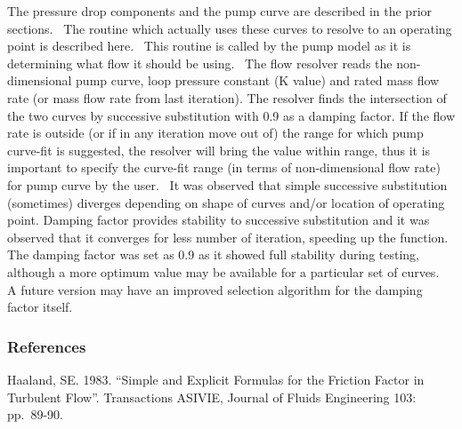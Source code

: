 The pressure drop components and the pump curve are described in the prior sections.~ The routine which actually uses these curves to resolve to an operating point is described here.~ This routine is called by the pump model as it is determining what flow it should be using.~ The flow resolver reads the non-dimensional pump curve, loop pressure constant (K value) and rated mass flow rate (or mass flow rate from last iteration). The resolver finds the intersection of the two curves by successive substitution with 0.9 as a damping factor. If the flow rate is outside (or if in any iteration move out of) the range for which pump curve-fit is suggested, the resolver will bring the value within range, thus it is important to specify the curve-fit range (in terms of non-dimensional flow rate) for pump curve by the user.~ It was observed that simple successive substitution (sometimes) diverges depending on shape of curves and/or location of operating point. Damping factor provides stability to successive substitution and it was observed that it converges for less number of iteration, speeding up the function. The damping factor was set as 0.9 as it showed full stability during testing, although a more optimum value may be available for a particular set of curves.~ A future version may have an improved selection algorithm for the damping factor itself.

\subsubsection{References}\label{references-037}

Haaland, SE. 1983. ``Simple and Explicit Formulas for the Friction Factor in Turbulent Flow''. Transactions ASIVIE, Journal of Fluids Engineering 103: pp.~89-90.
